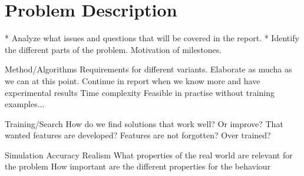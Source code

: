
\chapter{Problem Description}

  * Analyze what issues and questions that will be covered in the report.
  * Identify the different parts of the problem. Motivation of milestones.
  
  Method/Algorithms
    Requirements for different variants. Elaborate as mucha as we can at this point. Continue in report when we know more and have experimental results
    Time complexity
    Feasible in practise
    without training examples...
    
    Training/Search
      How do we find solutions that work well? Or improve?
      That wanted features are developed? Features are not forgotten?
      Over trained?
    
    
  Simulation
    Accuracy
    Realism
    What properties of the real world are relevant for the problem
    How important are the different properties for the behaviour
  
  